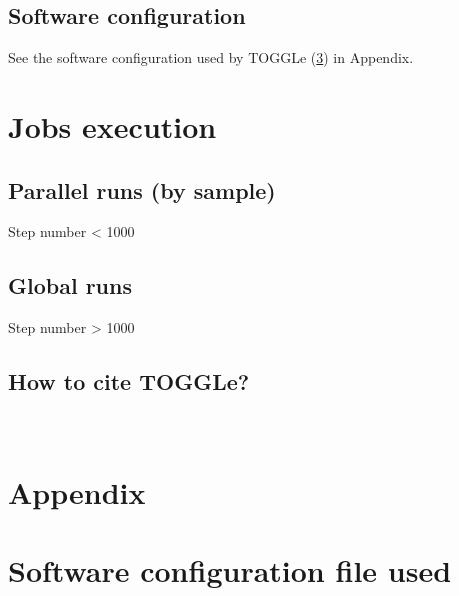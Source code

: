\documentclass[a4paper]{article}
\begin{document}
\subsection{Software configuration}
See the software configuration used by TOGGLe (\ref{configFile})  in Appendix.



 
 
\newpage
\section{Jobs execution}

\subsection{Parallel runs  (by sample)}
Step number < 1000


\subsection{Global runs}
Step number > 1000




\subsection{How to cite TOGGLe?}

\cite{Monat2015}

\clearpage




\
\clearpage
\section{Appendix}\appendix

\section{ Software configuration file used}
\label{configFile}

\end{document}
